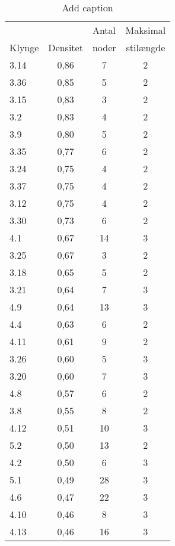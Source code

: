 \begin{table}[htbp]
  \centering
  \caption{Add caption}
    \begin{tabular}{lccc}
          &       & \multicolumn{1}{l}{Antal} & \multicolumn{1}{l}{Maksimal } \\
    \rowcolor[rgb]{ .753,  .753,  .753} Klynge & Densitet & noder & stilængde \\
    3.14  & 0,86  & 7     & 2 \\
    3.36  & 0,85  & 5     & 2 \\
    3.15  & 0,83  & 3     & 2 \\
    3.2   & 0,83  & 4     & 2 \\
    3.9   & 0,80  & 5     & 2 \\
    3.35  & 0,77  & 6     & 2 \\
    3.24  & 0,75  & 4     & 2 \\
    3.37  & 0,75  & 4     & 2 \\
    3.12  & 0,75  & 4     & 2 \\
    3.30  & 0,73  & 6     & 2 \\
    4.1   & 0,67  & 14    & 3 \\
    3.25  & 0,67  & 3     & 2 \\
    3.18  & 0,65  & 5     & 2 \\
    3.21  & 0,64  & 7     & 3 \\
    4.9   & 0,64  & 13    & 3 \\
    4.4   & 0,63  & 6     & 2 \\
    4.11  & 0,61  & 9     & 2 \\
    3.26  & 0,60  & 5     & 3 \\
    3.20  & 0,60  & 7     & 3 \\
    4.8   & 0,57  & 6     & 2 \\
    3.8   & 0,55  & 8     & 2 \\
    4.12  & 0,51  & 10    & 3 \\
    5.2   & 0,50  & 13    & 2 \\
    4.2   & 0,50  & 6     & 3 \\
    5.1   & 0,49  & 28    & 3 \\
    4.6   & 0,47  & 22    & 3 \\
    4.10  & 0,46  & 8     & 3 \\
    4.13  & 0,46  & 16    & 3 \\
    \end{tabular}%
  \label{tab:addlabel}%
\end{table}%




